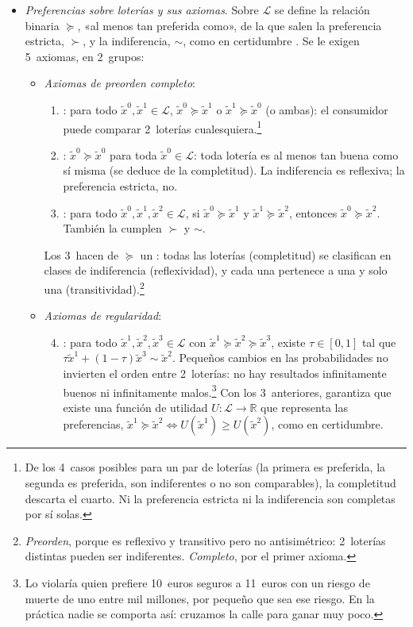 \documentclass[11pt]{article}
\begin{document}
\begin{itemize}
\item \emph{Preferencias sobre loterías y sus axiomas}. Sobre $\mathcal{L}$ se define la relación binaria $\succcurlyeq$, «al menos tan preferida como», de la que salen la preferencia estricta, $\succ$, y la indiferencia, $\sim$, como en certidumbre . Se le exigen 5~axiomas, en 2~grupos:
  \begin{itemize}
  \item \emph{Axiomas de preorden completo}:
    \begin{enumerate}
    \item {}: para todo $\tilde{x}^0,\tilde{x}^1\in\mathcal{L}$, $\tilde{x}^0\succcurlyeq\tilde{x}^1$ o $\tilde{x}^1\succcurlyeq\tilde{x}^0$ (o ambas): el consumidor puede comparar 2~loterías cualesquiera.\footnote{De los 4~casos posibles para un par de loterías (la primera es preferida, la segunda es preferida, son indiferentes o no son comparables), la completitud descarta el cuarto. Ni la preferencia estricta ni la indiferencia son completas por sí solas.}
    \item {}: $\tilde{x}^0\succcurlyeq\tilde{x}^0$ para toda $\tilde{x}^0\in\mathcal{L}$: toda lotería es al menos tan buena como sí misma (se deduce de la completitud). La indiferencia es reflexiva; la preferencia estricta, no.
    \item {}: para todo $\tilde{x}^0,\tilde{x}^1,\tilde{x}^2\in\mathcal{L}$, si $\tilde{x}^0\succcurlyeq\tilde{x}^1$ y $\tilde{x}^1\succcurlyeq\tilde{x}^2$, entonces $\tilde{x}^0\succcurlyeq\tilde{x}^2$. También la cumplen $\succ$ y $\sim$.
    \end{enumerate}
    Los 3~hacen de $\succcurlyeq$ un : todas las loterías (completitud) se clasifican en clases de indiferencia (reflexividad), y cada una pertenece a una y solo una (transitividad).\footnote{\emph{Preorden}, porque es reflexivo y transitivo pero no antisimétrico: 2~loterías distintas pueden ser indiferentes. \emph{Completo}, por el primer axioma.}
  \item \emph{Axiomas de regularidad}:
    \begin{enumerate}
    \setcounter{enumi}{3}
    \item {}: para todo $\tilde{x}^1,\tilde{x}^2,\tilde{x}^3\in\mathcal{L}$ con $\tilde{x}^1\succcurlyeq\tilde{x}^2\succcurlyeq\tilde{x}^3$, existe $\tau\in[0,1]$ tal que $\tau\tilde{x}^1+(1-\tau)\tilde{x}^3\sim\tilde{x}^2$. Pequeños cambios en las probabilidades no invierten el orden entre 2~loterías: no hay resultados infinitamente buenos ni infinitamente malos.\footnote{Lo violaría quien prefiere 10~euros seguros a 11~euros con un riesgo de muerte de uno entre mil millones, por pequeño que sea ese riesgo\nocite{MasColellWhinstonGreen1995}. En la práctica nadie se comporta así: cruzamos la calle para ganar muy poco.} Con los 3~anteriores, garantiza que existe una función de utilidad $U:\mathcal{L}\rightarrow\mathbb{R}$ que representa las preferencias, $\tilde{x}^1\succcurlyeq\tilde{x}^2\iff U(\tilde{x}^1)\geq U(\tilde{x}^2)$, como en certidumbre.

\end{enumerate}
\end{itemize}
\end{itemize}
\end{document}
